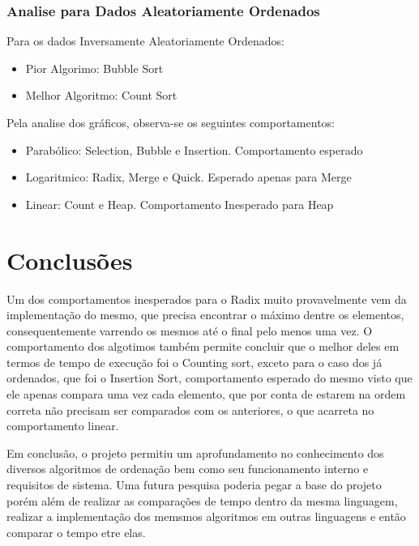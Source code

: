 \subsection{Analise para Dados Aleatoriamente Ordenados}
Para os dados Inversamente Aleatoriamente Ordenados:
\begin{itemize}
  \item Pior Algorimo: Bubble Sort
  \item Melhor Algoritmo: Count Sort 
\end{itemize}
Pela analise dos gráficos, observa-se os seguintes comportamentos:
\begin{itemize}
  \item Parabólico: Selection,  Bubble e Insertion. Comportamento esperado 
  \item Logaritmico: Radix, Merge e Quick. Esperado apenas para Merge 
  \item Linear: Count e Heap. Comportamento Inesperado para Heap
\end{itemize}

\chapter{Conclusões}
Um dos comportamentos inesperados para o Radix muito provavelmente vem da implementação do mesmo, que precisa encontrar o máximo dentre os elementos, consequentemente varrendo os mesmos até o final pelo menos uma vez. 
O comportamento dos algotimos também permite concluir que o melhor deles em termos de tempo de execução foi o Counting sort, exceto para o caso dos já ordenados, que foi o Insertion Sort, comportamento esperado do mesmo visto que ele apenas compara uma vez cada elemento, que por conta de estarem na ordem correta não precisam ser comparados com os anteriores, o que acarreta no comportamento linear.

Em conclusão, o projeto permitiu um aprofundamento no conhecimento dos diversos algoritmos de ordenação bem como seu funcionamento interno e requisitos de sistema. 
Uma futura pesquisa poderia pegar a base do projeto porém além de realizar as comparações de tempo dentro da mesma linguagem, realizar a implementação dos memsmos algoritmos em outras linguagens e então comparar o tempo etre elas.

